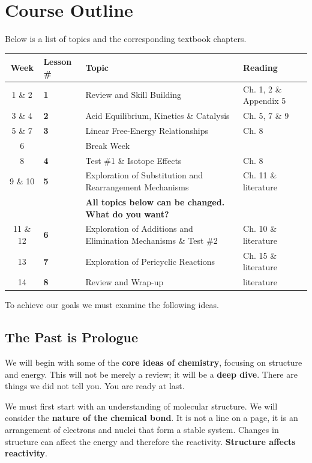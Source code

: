 \section{Course Outline}

Below is a list of topics and the corresponding textbook chapters.

\begin{table}[h]
\centering
\begin{tabular}{cllp{4cm}}
\toprule
Week & Lesson \# & Topic & Reading \\
\midrule
1 \& 2  & \textbf{1} & Review and Skill Building & Ch. 1, 2 \& Appendix 5 \\
3 \& 4  & \textbf{2} & Acid Equilibrium, Kinetics \& Catalysis & Ch. 5, 7 \& 9 \\
5 \& 7  & \textbf{3} & Linear Free-Energy Relationships & Ch. 8 \\
6        &           & Break Week & \\
8        & \textbf{4} & Test \#1 \& Isotope Effects & Ch. 8 \\
9 \& 10 & \textbf{5} & Exploration of Substitution and Rearrangement Mechanisms & Ch. 11 \& literature \\
          &           & \textbf{All topics below can be changed. What do you want?} & \\
11 \& 12 & \textbf{6} & Exploration of Additions and Elimination Mechanisms \& Test \#2 & Ch. 10 \& literature \\
13       & \textbf{7} & Exploration of Pericyclic Reactions & Ch. 15 \& literature \\
14       & \textbf{8} & Review and Wrap-up & literature \\
\bottomrule
\end{tabular}
\end{table}

To achieve our goals we must examine the following ideas.

\subsection{The Past is Prologue}

We will begin with some of the \textbf{core ideas of chemistry}, focusing on structure and energy. This will not be merely a review; it will be a \textbf{deep dive}. There are things we did not tell you. You are ready at last.

We must first start with an understanding of molecular structure. We will consider the \textbf{nature of the chemical bond}. It is not a line on a page, it is an arrangement of electrons and nuclei that form a stable system. Changes in structure can affect the energy and therefore the reactivity. \textbf{Structure affects reactivity}.

